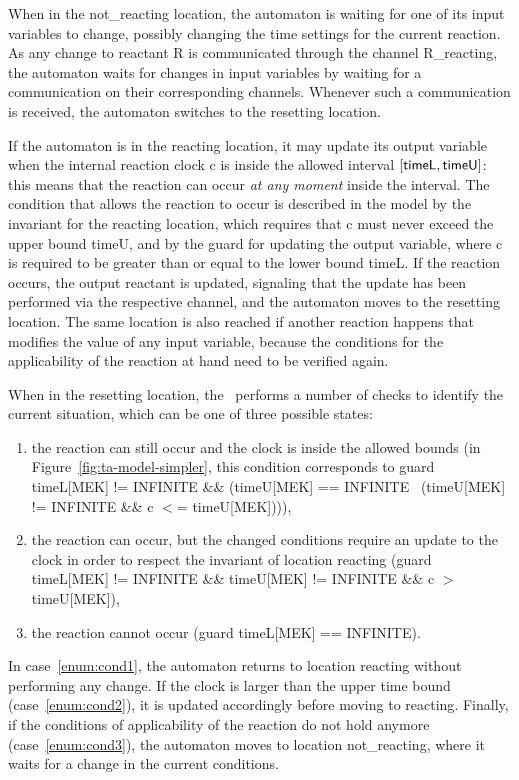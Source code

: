 When in the {\sf not\_reacting} location, the automaton is waiting for one of its input variables
to change, possibly changing the time settings for the current reaction.
As any change to reactant R is communicated through the
channel {\sf R\_reacting}, the automaton waits for changes in input variables by
waiting for a communication on their corresponding channels. Whenever such a communication is received,
the automaton switches to the {\sf resetting} location.

If the automaton is in the {\sf reacting} location, it may update its output variable when the internal reaction clock {\sf c}
is inside the allowed interval $[{\sf timeL}, {\sf timeU}]$: this means that the reaction can occur
\emph{at any moment} inside the interval.
The condition that allows the reaction to occur is described in the model by the
invariant for the {\sf reacting} location, which requires that {\sf c} must never exceed the upper bound {\sf timeU}, and by the guard
for updating the output variable, where {\sf c} is required to be greater than or equal to the lower
bound {\sf timeL}. If the reaction occurs, the output reactant is updated, signaling that the update has been performed via the
respective channel, and the automaton moves to the {\sf resetting} location. The same location is also reached if another
reaction happens that modifies the value of any input variable, because the conditions for the applicability
of the reaction at hand need to be verified again.

When in the {\sf resetting} location, the \ta\ performs a number of checks to identify the current situation, which
can be one of three possible states:
\begin{enumerate}
  \item\label{enum:cond1} the reaction can still occur
    and the clock is inside the allowed bounds (in Figure~\ref{fig:ta-model-simpler},
    this condition corresponds to guard {\sf timeL[MEK] != INFINITE \&\& (timeU[MEK] == INFINITE \textbar\textbar\ (timeU[MEK] != INFINITE \&\& c $<$= timeU[MEK]))}),
  \item\label{enum:cond2} the reaction can occur, but the changed conditions require an update to the clock in order to
    respect the invariant of location {\sf reacting} (guard {\sf timeL[MEK] != INFINITE \&\& timeU[MEK] != INFINITE \&\& c $>$ timeU[MEK]}),
  \item\label{enum:cond3} the reaction cannot occur (guard {\sf timeL[MEK] == INFINITE}).
\end{enumerate}
In case~\ref{enum:cond1}, the automaton returns to location {\sf reacting} without performing any change.
If the clock is larger than the upper time bound (case~\ref{enum:cond2}), it is updated accordingly before
moving to {\sf reacting}. Finally, if the conditions of applicability of the reaction do not hold anymore (case~\ref{enum:cond3}),
the automaton moves to location {\sf not\_reacting}, where it waits for a change in the current conditions.





